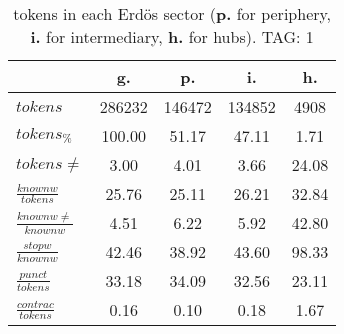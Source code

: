 \begin{table}[h!]
\begin{center}
\begin{tabular}{| l || c | c | c | c |}\hline
 & {\bf g.} & {\bf p.} & {\bf i.} & {\bf h.} \\\hline\hline
$tokens$ & 286232  & 146472  & 134852  & 4908 \\
$tokens_{\%}$ & 100.00  & 51.17  & 47.11  & 1.71 \\
$tokens \neq$ & 3.00  & 4.01  & 3.66  & 24.08 \\\hline
$\frac{knownw}{tokens}$ & 25.76  & 25.11  & 26.21  & 32.84 \\
$\frac{knownw \neq}{knownw}$ & 4.51  & 6.22  & 5.92  & 42.80 \\\hline
$\frac{stopw}{knownw}$ & 42.46  & 38.92  & 43.60  & 98.33 \\
$\frac{punct}{tokens}$ & 33.18  & 34.09  & 32.56  & 23.11 \\
$\frac{contrac}{tokens}$ & 0.16  & 0.10  & 0.18  & 1.67 \\\hline
\end{tabular}
\caption{tokens in each Erd\"os sector ({{\bf p.}} for periphery, {{\bf i.}} for intermediary, 
    {{\bf h.}} for hubs). TAG: 1}
\end{center}
\end{table}
